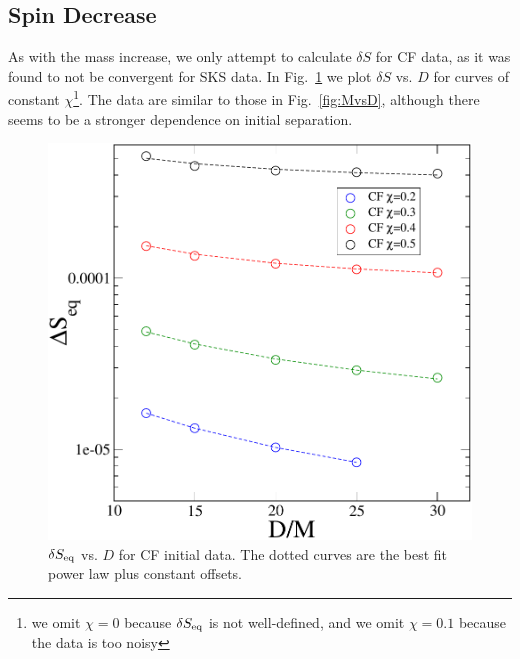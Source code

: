 


\subsection{Spin Decrease}
\label{subsec:SpinDecrease}
As with the mass increase, we only attempt to calculate $\delta S$ for CF data, as it was found to not be convergent for SKS
data. In Fig.~\ref{fig:SvsD} we plot $\delta S$ vs. $D$ for
curves of constant $\chi$\footnote{we omit $\chi=0$ because $\delta
  S_{\rm eq}$ is not well-defined, and we omit $\chi=0.1$ because the
  data is too noisy}. The data are similar to those in
Fig.~\ref{fig:MvsD}, although there seems to be a stronger dependence on initial separation.

\begin{figure}[!htbp]
 \includegraphics[scale=0.95]{chap5/SvsD2}
  \caption{$\delta S_{\rm eq}$ vs. $D$ for CF initial data. The dotted
    curves are the best fit power law plus constant offsets.}
  \label{fig:SvsD}
\end{figure}

